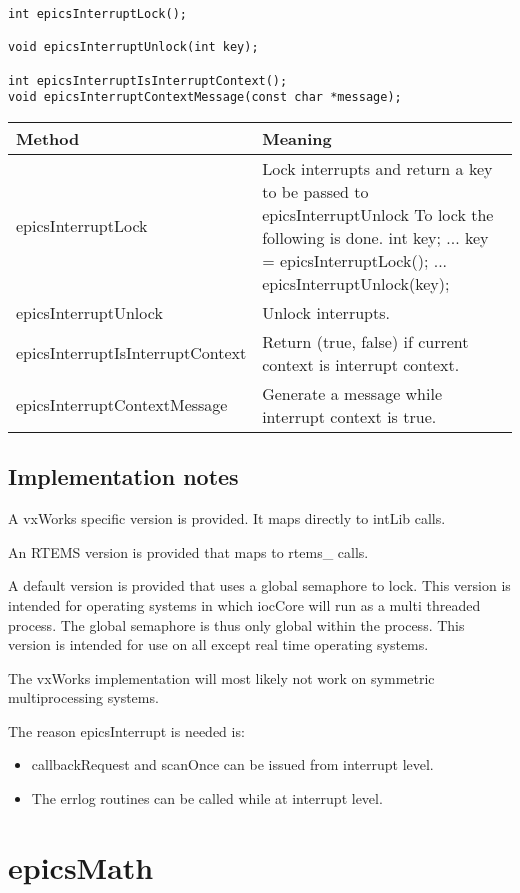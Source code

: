 \begin{verbatim}int epicsInterruptLock();

void epicsInterruptUnlock(int key);

int epicsInterruptIsInterruptContext();
void epicsInterruptContextMessage(const char *message);
\end{verbatim}
\begin{center}\begin{longtable}{p{1.97222in}p{3.66667in}}
\textbf{Method} & \textbf{Meaning}\\
\hline
epicsInterruptLock & Lock interrupts and return a key to be passed to epicsInterruptUnlock To lock the following is done.       int key;      ...      key = epicsInterruptLock();       ...       epicsInterruptUnlock(key);\\
epicsInterruptUnlock & Unlock interrupts.\\
epicsInterruptIsInterruptContext & Return (true, false) if current context is interrupt context.\\
epicsInterruptContextMessage & Generate a message while interrupt context is true.
\end{longtable}\end{center}


\subsection{Implementation notes}

A vxWorks specific version is provided. It maps directly to intLib calls.

An RTEMS version is provided that maps to rtems\_ calls.

A default version is provided that uses a global semaphore to lock. This version is intended for operating systems in 
which iocCore will run as a multi threaded process. The global semaphore is thus only global within the process. This 
version is intended for use on all except real time operating systems.

The vxWorks implementation will most likely not work on symmetric multiprocessing systems.

The reason epicsInterrupt is needed is:

\begin{itemize}\item callbackRequest and scanOnce can be issued from interrupt level.

\item The errlog routines can be called while at interrupt level.

\end{itemize}\section{epicsMath}

